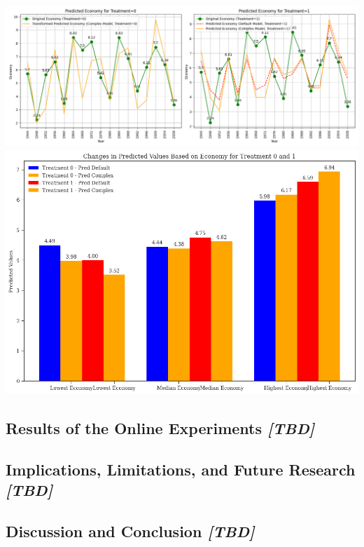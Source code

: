 \documentclass[
]{article}
\begin{document}
\includegraphics{treat_pred2.png} \includegraphics{pred_low.png}

\hypertarget{results-of-the-online-experiments-tbd}{%
\subsection{\texorpdfstring{Results of the Online Experiments
\emph{{[}TBD{]}}}{Results of the Online Experiments {[}TBD{]}}}\label{results-of-the-online-experiments-tbd}}

\hypertarget{implications-limitations-and-future-research-tbd}{%
\subsection{\texorpdfstring{Implications, Limitations, and Future
Research
\emph{{[}TBD{]}}}{Implications, Limitations, and Future Research {[}TBD{]}}}\label{implications-limitations-and-future-research-tbd}}

\hypertarget{discussion-and-conclusion-tbd}{%
\subsection{\texorpdfstring{Discussion and Conclusion
\emph{{[}TBD{]}}}{Discussion and Conclusion {[}TBD{]}}}\label{discussion-and-conclusion-tbd}}
\end{document}
